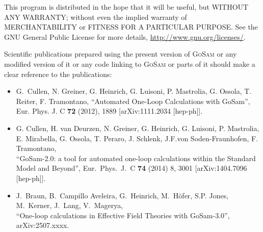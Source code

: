 \documentclass[11pt,a4paper, oneside]{scrbook}
\newcommand{\gosam}{\textsc{GoSam}\xspace}
\begin{document}
    This program is distributed in the hope that it will be useful,
    but WITHOUT ANY WARRANTY; without even the implied warranty of
    MERCHANTABILITY or FITNESS FOR A PARTICULAR PURPOSE.  See the
    GNU General Public License for more details, 
    \url{http://www.gnu.org/licenses/}.

   
    Scientific publications prepared using the present version of
    \gosam or any modified version of it or any code linking to
    \gosam or parts of it should make a clear reference to the publications:

    \begin{itemize}
      \item G.~Cullen, N. Greiner, G. Heinrich, G. Luisoni, 
              P. Mastrolia, G. Ossola, T. Reiter, F. Tramontano,
          ``Automated One-Loop Calculations with GoSam'',\\
       Eur. Phys. J. C \textbf{72} (2012), 1889 [arXiv:1111.2034 [hep-ph]].
       \item  G. Cullen,  H. van Deurzen, N. Greiner, G. Heinrich, G. Luisoni, 
              P. Mastrolia, E. Mirabella, G. Ossola, T. Peraro, J. Schlenk, 
	      J.F.von Soden-Fraunhofen, F. Tramontano, \\
	``GoSam-2.0: a tool for automated one-loop calculations within the Standard Model and Beyond'',
	Eur.\ Phys.\ J.\ C \textbf{74} (2014) 8,  3001 [arXiv:1404.7096 [hep-ph]].
      \item   J.~Braun, B.~Campillo Aveleira, G.~Heinrich, M.~H\"ofer, S.P. Jones, M.~Kerner, J.~Lang, V.~Magerya, \\
        ``One-loop calculations in Effective Field Theories with GoSam-3.0'',\\
        arXiv:2507.xxxx.
     \end{itemize}






\end{document}
